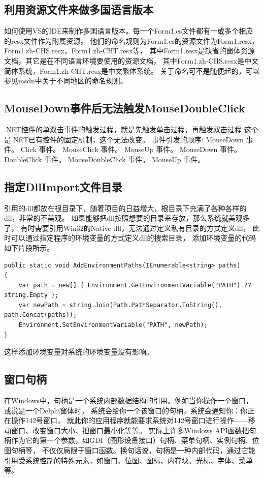 \documentclass{book}
\begin{document}
\subsection{利用资源文件来做多国语言版本}

如何使用VS的IDE来制作多国语言版本。每一个Form1.cs文件都有一或多个相应的resx文件作为附属资源。
他们的命名规则为Form1.cs的资源文件为Form1.resx，Form1.zh-CHS.resx，Form1.zh-CHT.resx等，
其中Form1.resx是缺省的窗体资源文档，其它是在不同语言环境要使用的资源文档，
其中Form1.zh-CHS.resx是中文简体系统，Form1.zh-CHT.resx是中文繁体系统。
关于命名可不是随便起的，可以参见msdn中关于不同地区的命名规则。

\subsection{MouseDown事件后无法触发MouseDoubleClick}

.NET控件的单双击事件的触发过程，就是先触发单击过程，再触发双击过程
这个是.NET已有控件的固定机制，这个无法改变。
事件引发的顺序:
MouseDown 事件。
Click 事件。
MouseClick 事件。
MouseUp 事件。
MouseDown 事件。
DoubleClick 事件。
MouseDoubleClick 事件。
MouseUp 事件。

\subsection{指定DllImport文件目录}

引用的dll都放在根目录下，随着项目的日益增大，根目录下充满了各种各样的dll，非常的不美观。
如果能够把dll按照想要的目录来存放，那么系统就美观多了，
有时需要引用Win32的Native dll，无法通过定义私有目录的方式定义dll，
此时可以通过指定程序的环境变量的方式定义dll的搜索目录，
添加环境变量的代码如下片段所示。

\begin{lstlisting}[language={[Sharp]C}]
public static void AddEnvironmentPaths(IEnumerable<string> paths)
{
	var path = new[] { Environment.GetEnvironmentVariable("PATH") ?? string.Empty };
	var newPath = string.Join(Path.PathSeparator.ToString(), path.Concat(paths));
	Environment.SetEnvironmentVariable("PATH", newPath);
}
\end{lstlisting}

这样添加环境变量对系统的环境变量没有影响。

\subsection{窗口句柄}

在Windows中，句柄是一个系统内部数据结构的引用。例如当你操作一个窗口，或说是一个Delphi窗体时，
系统会给你一个该窗口的句柄，系统会通知你：你正在操作142号窗口，
就此你的应用程序就能要求系统对142号窗口进行操作——移动窗口、改变窗口大小、把窗口最小化等等。
实际上许多Windows API函数把句柄作为它的第一个参数，如GDI（图形设备接口）句柄、菜单句柄、实例句柄、位图句柄等，
不仅仅局限于窗口函数。换句话说，句柄是一种内部代码，通过它能引用受系统控制的特殊元素，如窗口、位图、图标、内存块、光标、字体、菜单等。
\end{document}
